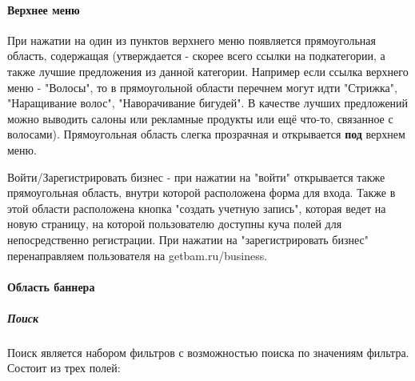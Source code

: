 \documentclass[DIV=calc, paper=a4, fontsize=11pt]{scrartcl} %
\begin{document}
\paragraph{Верхнее меню}
При нажатии на один из пунктов верхнего меню появляется прямоугольная область, содержащая (утверждается - скорее всего ссылки на подкатегории, а также лучшие предложения из данной категории. Например если ссылка верхнего меню - "Волосы", то в прямоугольной области перечнем могут идти "Стрижка", "Наращивание волос", "Наворачивание бигудей". В качестве лучших предложений можно выводить салоны или рекламные продукты или ещё что-то, связанное с волосами). Прямоугольная область слегка прозрачная и открывается \textbf{под} верхнем меню. 

Войти/Зарегистрировать бизнес - при нажатии на "войти" открывается также прямоугольная область, внутри которой расположена форма для входа. Также в этой области расположена кнопка "создать учетную запись", которая ведет на новую страницу, на которой пользователю доступны куча полей для непосредственно регистрации.
При нажатии на "зарегистрировать бизнес" перенаправляем пользователя на getbam.ru/business.

\paragraph{Область баннера}
\subparagraph{Поиск} Поиск является набором фильтров с возможностью поиска по значениям фильтра. Состоит из трех полей:
\end{document}
